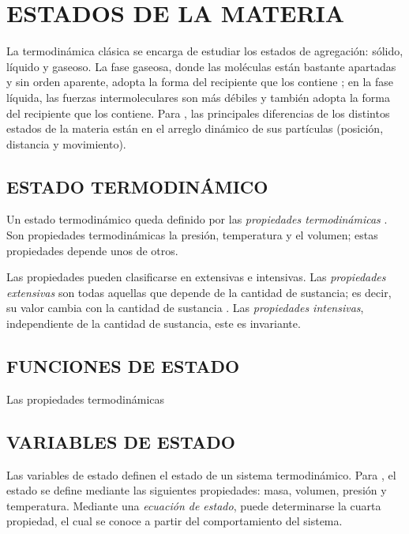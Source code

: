 
\section{ESTADOS DE LA MATERIA}
La termodinámica clásica se encarga de estudiar los estados de agregación: sólido, líquido y gaseoso. 
La fase gaseosa, donde las moléculas están bastante apartadas y sin orden aparente, adopta la forma del recipiente que los contiene \parencite[p. 111]{YunusA.Cengel2015}; 
en la fase líquida, las fuerzas intermoleculares son más débiles y también adopta la forma del recipiente  que los contiene. Para \parencite{ReyesChumacero2012}, las principales diferencias de los distintos estados de la materia están en el arreglo dinámico de sus partículas (posición, distancia y movimiento).

\subsection{ESTADO TERMODINÁMICO}
Un estado termodinámico queda definido por las \textit{propiedades termodinámicas} \parencite[26]{Smith.VanNess.Abbott2007}. Son  propiedades termodinámicas la presión, temperatura y el volumen; estas propiedades depende unos de otros.
\newline

Las propiedades pueden clasificarse en extensivas e intensivas. \newline
Las \textit{propiedades extensivas} son todas aquellas que depende de la cantidad de sustancia; es decir, su valor cambia con la cantidad de sustancia .
Las \textit{propiedades intensivas}, independiente de la cantidad de sustancia, este es invariante.

\subsection{FUNCIONES DE ESTADO}
Las propiedades termodinámicas 


\subsection{VARIABLES DE ESTADO}
Las variables de estado definen el estado de un sistema termodinámico. Para \parencite{castellan1998fisicoquimica}, el estado se define mediante las siguientes propiedades: masa, volumen, presión y temperatura. Mediante una { \it ecuación de estado}, puede determinarse la cuarta propiedad, el cual se conoce a partir del comportamiento del sistema.

